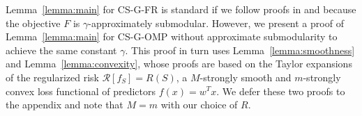 


Lemma~\ref{lemma:main} for CS-G-FR is standard if we follow proofs in \citep{streeter:08} and \citep{kemp} because the objective $F$ is $\gamma$-approximately submodular. 
However, we present a proof of 
Lemma~\ref{lemma:main} for CS-G-OMP without approximate submodularity to achieve the same constant $\gamma$. 
This proof in turn uses Lemma~\ref{lemma:smoothness} and Lemma~\ref{lemma:convexity}, whose proofs are based on the Taylor expansions of the regularized risk $\mathcal{R}[f_S]=R(S)$, a $M$-strongly smooth and $m$-strongly convex loss functional of predictors $f(x) = w^T x$.
We defer these two proofs to the appendix and note that 
$M=m$ with our choice of $R$. 






